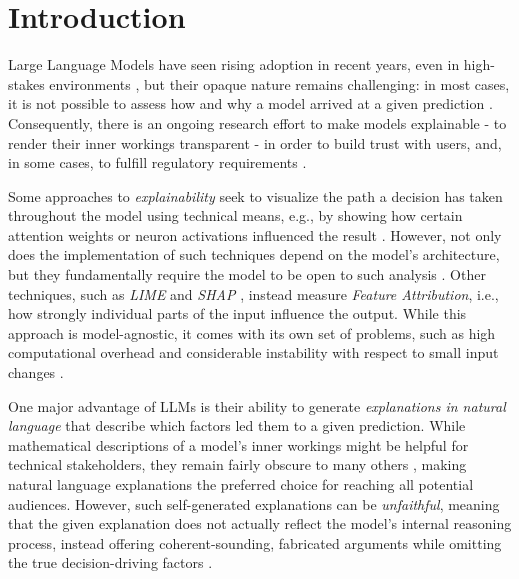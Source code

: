 \chapter{Introduction}
\label{ch:introduction}
Large Language Models have seen rising adoption in recent years, even in high-stakes environments \cite{maityLargeLanguageModels2025, laiLargeLanguageModels2024, hungWalkingTightropeEvaluating2023}, but their opaque nature remains challenging: in most cases, it is not possible to assess how and why a model arrived at a given prediction \cite{qamarUnderstandingBlackboxInterpretable2023}. Consequently, there is an ongoing research effort to make models explainable - to render their inner workings transparent - in order to build trust with users, and, in some cases, to fulfill regulatory requirements \cite{hsiehComprehensiveGuideExplainable2024, aliExplainableArtificialIntelligence2023, herreraMakingSenseUnsensible2025}.

Some approaches to \emph{explainability} seek to visualize the path a decision has taken throughout the model using technical means, e.g., by showing how certain attention weights or neuron activations influenced the result \cite{nazirSurveyFeatureAttribution2025, zhaoExplainabilityLargeLanguage2024}. However, not only does the implementation of such techniques depend on the model's architecture, but they fundamentally require the model to be open to such analysis \cite{nazirSurveyFeatureAttribution2025}. Other techniques, such as \emph{LIME} \cite{ribeiroWhyShouldTrust2016} and \emph{SHAP} \cite{lundbergUnifiedApproachInterpreting2017}, instead measure \emph{Feature Attribution}, i.e., how strongly individual parts of the input influence the output. While this approach is model-agnostic, it comes with its own set of problems, such as high computational overhead and considerable instability with respect to small input changes \cite{nazirSurveyFeatureAttribution2025}.

One major advantage of LLMs is their ability to generate \emph{explanations in natural language} that describe which factors led them to a given prediction. While mathematical descriptions of a model's inner workings might be helpful for technical stakeholders, they remain fairly obscure to many others \cite{herreraMakingSenseUnsensible2025}, making natural language explanations the preferred choice for reaching all potential audiences. However, such self-generated explanations can be \emph{unfaithful}, meaning that the given explanation does not actually reflect the model's internal reasoning process, instead offering coherent-sounding, fabricated arguments while omitting the true decision-driving factors \cite{turpinLanguageModelsDont2023}.

